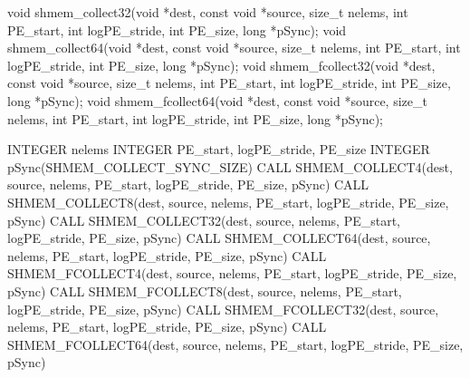 
\begin{apidefinition}

\begin{Csynopsis}
void shmem_collect32(void *dest, const void *source, size_t nelems, int PE_start, int logPE_stride, int PE_size, long *pSync);
void shmem_collect64(void *dest, const void *source, size_t nelems, int PE_start, int logPE_stride, int PE_size, long *pSync);
void shmem_fcollect32(void *dest, const void *source, size_t nelems, int PE_start, int logPE_stride, int PE_size, long *pSync);
void shmem_fcollect64(void *dest, const void *source, size_t nelems, int PE_start, int logPE_stride, int PE_size, long *pSync);
\end{Csynopsis}

\begin{Fsynopsis}
INTEGER nelems
INTEGER PE_start, logPE_stride, PE_size
INTEGER pSync(SHMEM_COLLECT_SYNC_SIZE)
CALL SHMEM_COLLECT4(dest, source, nelems, PE_start, logPE_stride, PE_size, pSync)
CALL SHMEM_COLLECT8(dest, source, nelems, PE_start, logPE_stride, PE_size, pSync)
CALL SHMEM_COLLECT32(dest, source, nelems, PE_start, logPE_stride, PE_size, pSync)
CALL SHMEM_COLLECT64(dest, source, nelems, PE_start, logPE_stride, PE_size, pSync)
CALL SHMEM_FCOLLECT4(dest, source, nelems, PE_start, logPE_stride, PE_size, pSync)
CALL SHMEM_FCOLLECT8(dest, source, nelems, PE_start, logPE_stride, PE_size, pSync)
CALL SHMEM_FCOLLECT32(dest, source, nelems, PE_start, logPE_stride, PE_size, pSync)
CALL SHMEM_FCOLLECT64(dest, source, nelems, PE_start, logPE_stride, PE_size, pSync)
\end{Fsynopsis}

\begin{apiarguments}


\end{apiarguments}
\end{apidefinition}
